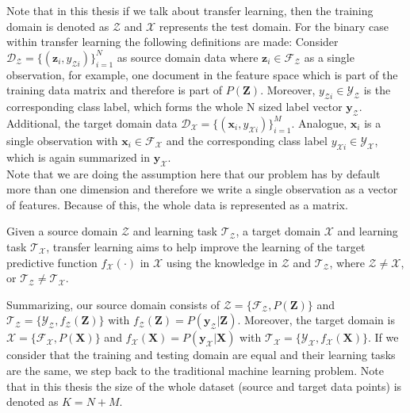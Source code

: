 Note that in this thesis if we talk about transfer learning, then the training domain is denoted as $\mathcal{Z}$ and $\mathcal{X}$ represents the test domain.
For the binary case within transfer learning the following definitions are made:
Consider $\mathcal{D_Z} = \{(\mathbf{z}_i,y_{\mathcal{Z}i})\}_{i=1}^{N}$ as source domain data where $\mathbf{z}_i \in \mathcal{F}_\mathcal{Z}$ as a single observation, for example, one document in the feature space which is part of the training data matrix and therefore is part of $P(\mathbf{Z})$.
Moreover, $y_{\mathcal{Z}i} \in \mathcal{Y}_\mathcal{Z}$ is the corresponding class label, which forms the whole N sized label vector $\mathbf{y}_\mathcal{Z}$.
Additional, the target domain data $\mathcal{D_X} = \{(\mathbf{x}_i,y_{\mathcal{X}i})\}_{i=1}^{M}$.
Analogue, $\mathbf{x}_i$ is a single observation with $\mathbf{x}_i \in \mathcal{F}_\mathcal{X}$ and the corresponding class label $y_{\mathcal{X}i} \in \mathcal{Y}_\mathcal{X}$, which is again summarized in $\mathbf{y}_\mathcal{X}$.\cite[p. 2]{Aggarwal.2015}\\
Note that we are doing the assumption here that our problem has by default more than one dimension and therefore we write a single observation as a vector of features.
Because of this, the whole data is represented as a matrix.
\begin{mDef}\label{DefTl}
	Given a source domain $\mathcal{Z}$ and learning task $\mathcal{T}_\mathcal{Z}$, a target domain $\mathcal{X}$ and learning task $\mathcal{T}_\mathcal{X}$, transfer learning aims to help improve the learning of the target predictive function $f_\mathcal{X}(\cdot)$ in $\mathcal{X}$ using the knowledge in $\mathcal{Z}$ and $\mathcal{T}_\mathcal{Z}$, where $\mathcal{Z} \neq \mathcal{X}$, or $\mathcal{T}_\mathcal{Z} \neq \mathcal{T}_\mathcal{X}$.\cite[p. 542]{Aggarwal.2015}
\end{mDef}
Summarizing, our source domain consists of $\mathcal{Z}=\{\mathcal{F}_\mathcal{Z},P(\mathbf{Z})\}$ and $\mathcal{T_Z}=\{\mathcal{Y_Z},f_\mathcal{Z}(\mathbf{Z})\}$ with $f_\mathcal{Z}(\mathbf{Z}) = P(\mathbf{y}_\mathcal{Z}|\mathbf{Z})$. Moreover, the target domain is  $\mathcal{X}=\{\mathcal{F}_\mathcal{X},P(\mathbf{X})\}$ and $f_\mathcal{X}(\mathbf{X}) = P(\mathbf{y}_\mathcal{X}|\mathbf{X})$ with $\mathcal{T_X}=\{\mathcal{Y_X},f_\mathcal{X}(\mathbf{X})\}$. 
If we consider that the training and testing domain are equal and their learning tasks are the same, we step back to the traditional machine learning problem.
Note that in this thesis the size of the whole dataset (source and target data points) is denoted as $K=N+M$.
